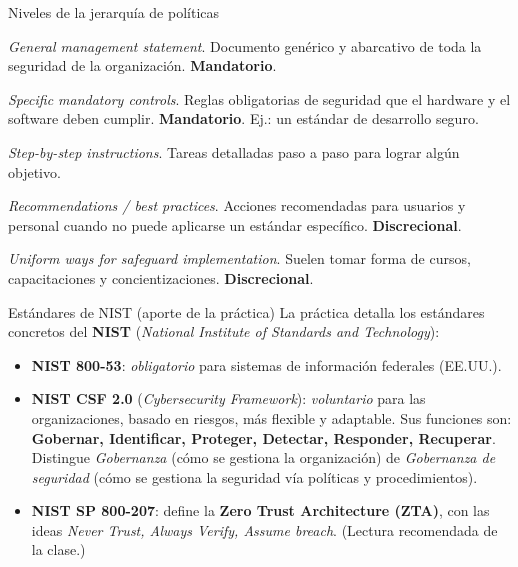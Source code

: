 \documentclass[11pt,a4paper]{article}
\begin{document}
\begin{defbox}{Niveles de la jerarquía de políticas}
\begin{description}[leftmargin=0pt,labelsep=0.4em,style=nextline,itemsep=2pt]
  \item[Policy (Política)] \emph{General management statement}. Documento genérico y
        abarcativo de toda la seguridad de la organización. \textbf{Mandatorio}.
  \item[Standards (Estándares)] \emph{Specific mandatory controls}. Reglas obligatorias de
        seguridad que el hardware y el software deben cumplir. \textbf{Mandatorio}. Ej.: un
        estándar de desarrollo seguro.
  \item[Procedures (Procedimientos)] \emph{Step-by-step instructions}. Tareas detalladas paso
        a paso para lograr algún objetivo.
  \item[Guidelines (Guías / directrices)] \emph{Recommendations / best practices}. Acciones
        recomendadas para usuarios y personal cuando no puede aplicarse un estándar específico.
        \textbf{Discrecional}.
  \item[Baselines] \emph{Uniform ways for safeguard implementation}. Suelen tomar forma de
        cursos, capacitaciones y concientizaciones. \textbf{Discrecional}.
\end{description}
\end{defbox}

\begin{practbox}{Estándares de NIST (aporte de la práctica)}
La práctica detalla los estándares concretos del \textbf{NIST} (\emph{National Institute of
Standards and Technology}):
\begin{itemize}[leftmargin=1.4em,itemsep=2pt]
  \item \textbf{NIST 800-53}: \emph{obligatorio} para sistemas de información federales (EE.UU.).
  \item \textbf{NIST CSF 2.0} (\emph{Cybersecurity Framework}): \emph{voluntario} para las
        organizaciones, basado en riesgos, más flexible y adaptable. Sus funciones son:
        \textbf{Gobernar, Identificar, Proteger, Detectar, Responder, Recuperar}. Distingue
        \emph{Gobernanza} (cómo se gestiona la organización) de \emph{Gobernanza de seguridad}
        (cómo se gestiona la seguridad vía políticas y procedimientos).
  \item \textbf{NIST SP 800-207}: define la \textbf{Zero Trust Architecture (ZTA)}, con las
        ideas \emph{Never Trust, Always Verify, Assume breach}. (Lectura recomendada de la
        clase.)
\end{itemize}
\end{practbox}
\end{document}
